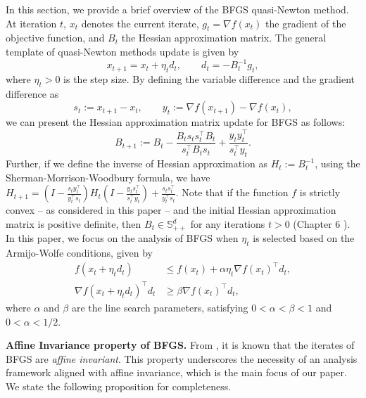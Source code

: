\documentclass[11pt,letterpaper]{article}
\newcommand\0{{\Vector{0}}}
\newcommand\1{{\Vector{1}}}
\numberwithin{assumption}{section}
\numberwithin{definition}{section}
\numberwithin{theorem}{section}
\numberwithin{remark}{section}
\begin{document}
In this section, we provide a brief overview of the BFGS quasi-Newton method. At iteration \( t \), \( x_t \) denotes the current iterate, \( g_t = \nabla f(x_t) \) the gradient of the objective function, and \( B_t \) the Hessian approximation matrix. The general template of quasi-Newton methods update is given by
\begin{equation}\label{QN_update}
    x_{t + 1} = x_t + \eta_t d_t, \qquad d_t = -B_t^{-1} g_t,
\end{equation}
where $\eta_t > 0$ is the step size. By defining the variable difference and the gradient difference as
\begin{equation}\label{QN_difference}
    s_t := x_{t + 1} - x_t, \qquad y_t := \nabla f(x_{t + 1}) - \nabla f(x_t),
\end{equation}
we can present the Hessian approximation matrix update for BFGS as follows:
\begin{equation}\label{eq:BFGS_update}
    B_{t + 1} := B_t - \frac{B_t s_t s_t^\top B_t}{s_t^\top B_t s_t} + \frac{y_t y_t^\top}{s_t^\top y_t}.
\end{equation}
Further, if we define the inverse of Hessian approximation  as $H_t := B_t^{-1}$, using the Sherman-Morrison-Woodbury formula, we have $H_{t+1} = (I-\frac{s_t y_t^\top}{y_t^\top s_t}) H_t (I-\frac{ y_t s_t^\top}{s_t^\top y_t}) +\frac{s_t s_t^\top}{y_t^\top s_t}$. Note that if the function $f$ is strictly convex -- as considered in this paper -- and the initial Hessian approximation matrix is positive definite, then $B_{t} \in \mathbb{S}^d_{++}$ for any iterations $t > 0$ (Chapter 6 \cite{nocedal2006numerical}). In this paper, we focus on the analysis of BFGS when $\eta_t$ is selected based on the Armijo-Wolfe conditions, given by
\begin{align}
    f(x_t + \eta_t d_t) & \leq f(x_t) + \alpha \eta_t\nabla{f(x_t)}^\top d_t, \label{sufficient_decrease}\\
    \nabla{f(x_t + \eta_t d_t)}^\top d_t & \geq \beta \nabla{f(x_t)}^\top d_t, \label{curvature_condition}
\end{align}
where $\alpha$ and $\beta$ are the line search parameters, satisfying $0 < \alpha < \beta < 1$ and $0 < \alpha < {1}/{2}$. %

\noindent \textbf{Affine Invariance property of BFGS.} From \cite{affine1, affine2}, it is known that the iterates of BFGS are \textit{affine invariant}. This property underscores the necessity of an analysis framework aligned with affine invariance, which is the main focus of our paper. We state the following proposition for completeness. %
\end{document}
